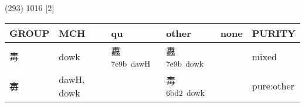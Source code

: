 \documentclass[14pt,a4paper]{scrartcl}
\begin{document}
(293) 1016 {[}2{]}

\begin{longtable}[c]{@{}llllll@{}}
\toprule
\begin{minipage}[b]{0.14\columnwidth}\raggedright\strut
GROUP
\strut\end{minipage} &
\begin{minipage}[b]{0.14\columnwidth}\raggedright\strut
MCH
\strut\end{minipage} &
\begin{minipage}[b]{0.14\columnwidth}\raggedright\strut
qu
\strut\end{minipage} &
\begin{minipage}[b]{0.14\columnwidth}\raggedright\strut
other
\strut\end{minipage} &
\begin{minipage}[b]{0.14\columnwidth}\raggedright\strut
none
\strut\end{minipage} &
\begin{minipage}[b]{0.14\columnwidth}\raggedright\strut
PURITY
\strut\end{minipage}\tabularnewline
\midrule
\endhead
\begin{minipage}[t]{0.14\columnwidth}\raggedright\strut
毒
\strut\end{minipage} &
\begin{minipage}[t]{0.14\columnwidth}\raggedright\strut
dowk
\strut\end{minipage} &
\begin{minipage}[t]{0.14\columnwidth}\raggedright\strut
纛\textsuperscript{7e9b~dawH}
\strut\end{minipage} &
\begin{minipage}[t]{0.14\columnwidth}\raggedright\strut
纛\textsuperscript{7e9b~dowk}
\strut\end{minipage} &
\begin{minipage}[t]{0.14\columnwidth}\raggedright\strut
\strut\end{minipage} &
\begin{minipage}[t]{0.14\columnwidth}\raggedright\strut
mixed
\strut\end{minipage}\tabularnewline
\begin{minipage}[t]{0.14\columnwidth}\raggedright\strut
毐
\strut\end{minipage} &
\begin{minipage}[t]{0.14\columnwidth}\raggedright\strut
dawH, dowk
\strut\end{minipage} &
\begin{minipage}[t]{0.14\columnwidth}\raggedright\strut
\strut\end{minipage} &
\begin{minipage}[t]{0.14\columnwidth}\raggedright\strut
毒\textsuperscript{6bd2~dowk}
\strut\end{minipage} &
\begin{minipage}[t]{0.14\columnwidth}\raggedright\strut
\strut\end{minipage} &
\begin{minipage}[t]{0.14\columnwidth}\raggedright\strut
pure:other
\strut\end{minipage}\tabularnewline
\bottomrule
\end{longtable}
\end{document}
